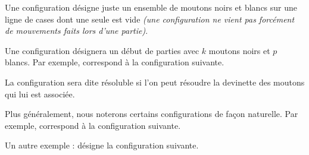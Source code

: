 \begin{definition}
	Une configuration désigne juste un ensemble de moutons noirs et blancs sur une ligne de cases dont une seule est vide \emph{(une configuration ne vient pas forcément de mouvements faits lors d'une partie)}.
\end{definition}


\begin{definition}
	Une configuration  désignera un début de parties avec $k$ moutons noirs et $p$ blancs.
	Par exemple,  correspond à la configuration suivante.
\end{definition}


\begin{definition}
	La configuration  sera dite résoluble si l'on peut résoudre la devinette des moutons qui lui est associée.
\end{definition}


\begin{remark}
	Plus généralement, nous noterons certains configurations de façon naturelle. Par exemple,  correspond à la configuration suivante.


	Un autre exemple :  désigne la configuration suivante.
	
\end{remark}
